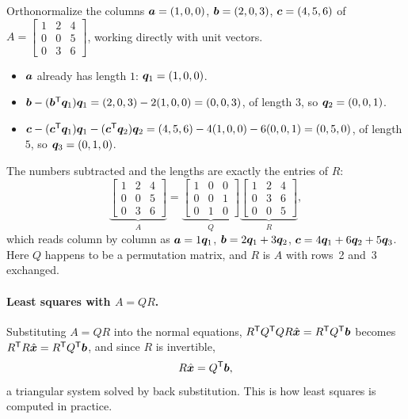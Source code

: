 \begin{example}\label{ex:u19-recitation}
Orthonormalize the columns $\boldsymbol{a}=(1,0,0)$, $\boldsymbol{b}=(2,0,3)$, $\boldsymbol{c}=(4,5,6)$ of
$A=\left[\begin{smallmatrix}1&2&4\\0&0&5\\0&3&6\end{smallmatrix}\right]$, working directly
with unit vectors.
\begin{itemize}
  \item $\boldsymbol{a}$ already has length $1$: $\boldsymbol{q}_1=(1,0,0)$.
  \item $\boldsymbol{b}-(\boldsymbol{b}^{\mathsf{T}}\boldsymbol{q}_1)\boldsymbol{q}_1=(2,0,3)-2(1,0,0)=(0,0,3)$, of length $3$, so
    $\boldsymbol{q}_2=(0,0,1)$.
  \item $\boldsymbol{c}-(\boldsymbol{c}^{\mathsf{T}}\boldsymbol{q}_1)\boldsymbol{q}_1-(\boldsymbol{c}^{\mathsf{T}}\boldsymbol{q}_2)\boldsymbol{q}_2=(4,5,6)-4(1,0,0)-6(0,0,1)=(0,5,0)$,
    of length $5$, so $\boldsymbol{q}_3=(0,1,0)$.
\end{itemize}
The numbers subtracted and the lengths are exactly the entries of $R$:
\[
  \underbrace{\begin{bmatrix}1&2&4\\0&0&5\\0&3&6\end{bmatrix}}_{A}
  =\underbrace{\begin{bmatrix}1&0&0\\0&0&1\\0&1&0\end{bmatrix}}_{Q}
   \underbrace{\begin{bmatrix}1&2&4\\0&3&6\\0&0&5\end{bmatrix}}_{R},
\]
which reads column by column as $\boldsymbol{a}=1\boldsymbol{q}_1$, $\boldsymbol{b}=2\boldsymbol{q}_1+3\boldsymbol{q}_2$,
$\boldsymbol{c}=4\boldsymbol{q}_1+6\boldsymbol{q}_2+5\boldsymbol{q}_3$. Here $Q$ happens to be a permutation matrix, and $R$
is $A$ with rows~2 and~3 exchanged.
\end{example}

\paragraph{Least squares with \texorpdfstring{$A=QR$}{A = QR}.}
Substituting $A=QR$ into the normal equations,
$R^{\mathsf{T}} Q^{\mathsf{T}} QR\hat{\boldsymbol{x}}=R^{\mathsf{T}} Q^{\mathsf{T}}\boldsymbol{b}$ becomes $R^{\mathsf{T}} R\hat{\boldsymbol{x}}=R^{\mathsf{T}} Q^{\mathsf{T}}\boldsymbol{b}$, and since $R$
is invertible,
\[
  R\hat{\boldsymbol{x}}=Q^{\mathsf{T}}\boldsymbol{b},
\]
a triangular system solved by back substitution. This is how least squares is computed in
practice.

